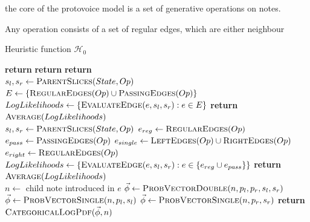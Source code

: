 \documentclass[12pt,a4paper,twoside,openright]{report} \usepackage[pdfborder={0 0 0}]{hyperref}    %
\theoremstyle{definition} \newtheorem{definition}{Definition}[section]
\begin{document}
  the core of the protovoice model is a set of generative operations on notes. 

  Any operation consists of a set of regular edges, which are either neighbour

  \begin{algorithm}[h] \caption{Heuristic function $\mathcal{H}_0$}
    \label{code:heuristic0}

    \begin{algorithmic}[1]   \State \textbf{return}
        \State \textbf{return}   \State \textbf{return}   \EndIf
      \EndFunction \\

       \State $s_l, s_r \gets \Call{ParentSlices}{State, Op}$ \State $E \gets
      \{\Call{RegularEdges}{Op} \cup \Call{PassingEdges}{Op}\}$
      \State $LogLikelihoods \gets \{ \Call{EvaluateEdge}{e, s_l, s_r} : e \in E\}$ \State \textbf{return}
      $\Call{Average}{LogLikelihoods}$ \EndFunction \\

        \State $s_l, s_r \gets
      \Call{ParentSlices}{State, Op}$ \State $e_{reg} \gets \Call{RegularEdges}{Op}$ \State $e_{pass} \gets
      \Call{PassingEdges}{Op}$ \State $e_{single} \gets \Call{LeftEdges}{Op} \cup \Call{RightEdges}{Op}$ \State
      $e_{right} \gets \Call{RegularEdges}{Op}$ \State $LogLikelihoods \gets \{ \Call{EvaluateEdge}{e, s_l, s_r} : e \in
      \{e_{reg} \cup e_{pass}\}\}$ \State \textbf{return} $\Call{Average}{LogLikelihoods}$ \EndFunction \\

       \State $n \gets $ child note introduced in $e$  \State $\vec{\phi} \gets \Call{ProbVectorDouble}{n,p_l,p_r,s_l,s_r}$  \State $\vec{\phi} \gets \Call{ProbVectorSingle}{n,p_l,s_l}$  \State $\vec{\phi} \gets \Call{ProbVectorSingle}{n,p_r,s_r}$ \EndIf \State
    \textbf{return} $\Call{CategoricalLogPdf}{\vec{\phi}, n}$ \EndFunction \\ \end{algorithmic} \end{algorithm}
\end{document}
